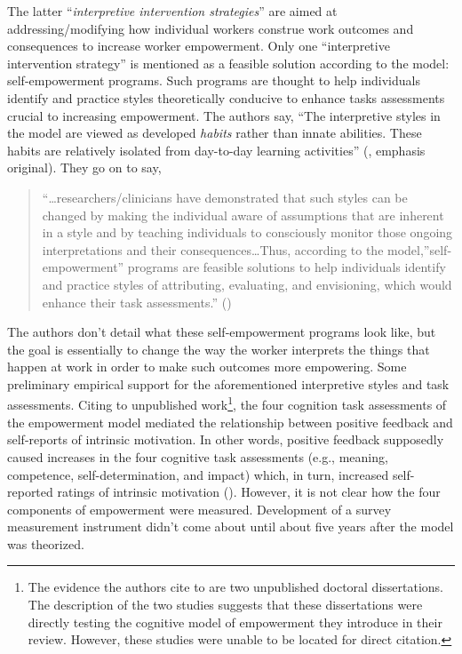 \documentclass[
  11pt,
  a4paper,
]{article}
\begin{document}
The latter ``\emph{interpretive intervention strategies}'' are aimed at
addressing/modifying how individual workers construe work outcomes and
consequences to increase worker empowerment. Only one ``interpretive
intervention strategy'' is mentioned as a feasible solution according to
the model: self-empowerment programs. Such programs are thought to help
individuals identify and practice styles theoretically conducive to
enhance tasks assessments crucial to increasing empowerment. The authors
say, ``The interpretive styles in the model are viewed as developed
\emph{habits} rather than innate abilities. These habits are relatively
isolated from day-to-day learning activities''
(, emphasis
original). They go on to say,

\begin{quote}
``\ldots researchers/clinicians have demonstrated that such styles can
be changed by making the individual aware of assumptions that are
inherent in a style and by teaching individuals to consciously monitor
those ongoing interpretations and their consequences\ldots Thus,
according to the model,''self-empowerment'' programs are feasible
solutions to help individuals identify and practice styles of
attributing, evaluating, and envisioning, which would enhance their task
assessments.'' ()
\end{quote}

The authors don't detail what these self-empowerment programs look like,
but the goal is essentially to change the way the worker interprets the
things that happen at work in order to make such outcomes more
empowering. Some preliminary empirical support for the aforementioned
interpretive styles and task assessments. Citing to unpublished
work\footnote{The evidence the authors cite to are two unpublished
  doctoral dissertations. The description of the two studies suggests
  that these dissertations were directly testing the cognitive model of
  empowerment they introduce in their review. However, these studies
  were unable to be located for direct citation.}, the four cognition
task assessments of the empowerment model mediated the relationship
between positive feedback and self-reports of intrinsic motivation. In
other words, positive feedback supposedly caused increases in the four
cognitive task assessments (e.g., meaning, competence,
self-determination, and impact) which, in turn, increased self-reported
ratings of intrinsic motivation (). However, it is not clear how the four components
of empowerment were measured. Development of a survey measurement
instrument didn't come about until about five years after the model was
theorized.
\end{document}
